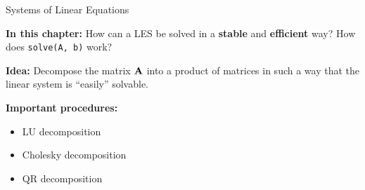 \begin{vbframe}{Systems of Linear Equations}
\lz

\textbf{In this chapter:} How can a LES be solved in a \textbf{stable} and \textbf{efficient} way? How does \texttt{solve(A, b)} work?

\lz

\textbf{Idea:} Decompose the matrix $\mathbf{A}$ into a product of matrices in such a way that the linear system is \enquote{easily} solvable.

\lz

\textbf{Important procedures: }

\begin{itemize}
\item LU decomposition
\item Cholesky decomposition
\item QR decomposition
\end{itemize}

\end{vbframe}

